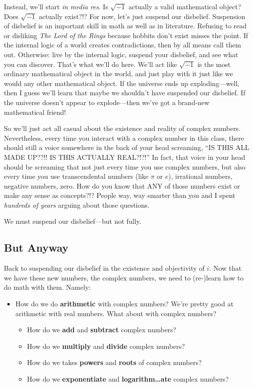 \documentclass[
]{article}
\providecommand{\tightlist}{%
  \setlength{\itemsep}{0pt}\setlength{\parskip}{0pt}}
\begin{document}
Instead, we'll start \emph{in media res}. Is \(\sqrt{-1}\) actually a
valid mathematical object? Does \(\sqrt{-1}\) actually exist?!? For now,
let's just suspend our disbelief. Suspension of disbelief is an
important skill in math as well as in literature. Refusing to read or
disliking \emph{The Lord of the Rings} because hobbits don't exist
misses the point. If the internal logic of a world creates
contradictions, then by all means call them out. Otherwise: live by the
internal logic, suspend your disbelief, and see what you can discover.
That's what we'll do here. We'll act like \(\sqrt{-1}\) is the most
ordinary mathematical object in the world, and just play with it just
like we would any other mathematical object. If the universe ends up
exploding---well, then I guess we'll learn that maybe we shouldn't have
suspended our disbelief. If the universe doesn't appear to
explode---then we've got a brand-new mathematical friend!

So we'll just act all casual about the existence and reality of complex
numbers. Nevertheless, every time you interact with a complex number in
this class, there should still a voice somewhere in the back of your
head screaming, ``IS THIS ALL MADE UP??!! IS THIS ACTUALLY REAL?!?!'' In
fact, that voice in your head should be screaming that not just every
time you use complex numbers, but also every time you use transcendental
numbers (like \(\pi\) or \(e\)), irrational numbers, negative numbers,
zero. How do you know that ANY of those numbers exist or make any sense
as concepts?!? People way, way smarter than you and I spent
\emph{hundreds of years} arguing about those questions.

We must suspend our disbelief---but not fully.

\hypertarget{but-anyway}{%
\subsection{But Anyway}\label{but-anyway}}

Back to suspending our disbelief in the existence and objectivity of
\(i\). Now that we have these new numbers, the complex numbers, we need
to (re-)learn how to do math with them. Namely:

\begin{itemize}
\tightlist
\item
  How do we do \textbf{arithmetic} with complex numbers? We're pretty
  good at arithmetic with real numbers. What about with complex numbers?

  \begin{itemize}
  \tightlist
  \item
    How do we \textbf{add} and \textbf{subtract} complex numbers?
  \item
    How do we \textbf{multiply} and \textbf{divide} complex numbers?
  \item
    How do we takes \textbf{powers} and \textbf{roots} of complex
    numbers?
  \item
    How do we \textbf{exponentiate} and \textbf{logarithm\ldots ate}
    complex numbers?
  \end{itemize}
\end{itemize}
\end{document}
